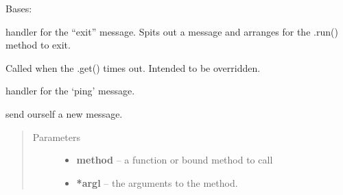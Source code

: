 \documentclass[letterpaper,10pt,english]{sphinxmanual}
\begin{document}
\begin{fulllineitems}
\label{enuActor:enuActor.QThread.QThread}
Bases: 

\begin{fulllineitems}
\label{enuActor:enuActor.QThread.QThread.exitMsg}
handler for the ``exit'' message. Spits out a message and arranges for the .run() method to exit.

\end{fulllineitems}


\begin{fulllineitems}
\label{enuActor:enuActor.QThread.QThread.handleTimeout}
Called when the .get() times out. Intended to be overridden.

\end{fulllineitems}


\begin{fulllineitems}
\label{enuActor:enuActor.QThread.QThread.pingMsg}
handler for the `ping' message.

\end{fulllineitems}


\begin{fulllineitems}
\label{enuActor:enuActor.QThread.QThread.putMsg}
send ourself a new message.
\begin{quote}\begin{description}
\item[{Parameters}] \leavevmode\begin{itemize}
\item {} 
\textbf{method} -- a function or bound method to call

\item {} 
\textbf{*argl} -- the arguments to the method.


\end{itemize}
\end{description}
\end{quote}
\end{fulllineitems}
\end{fulllineitems}
\end{document}
